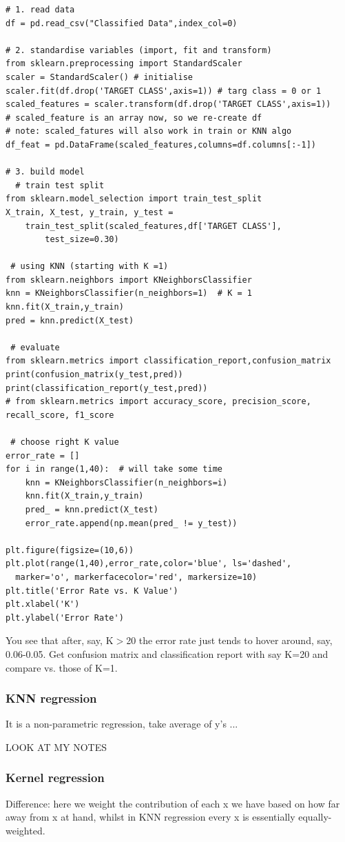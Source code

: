 \documentclass[12pt]{article}
\begin{document}
\begin{lstlisting}
# 1. read data
df = pd.read_csv("Classified Data",index_col=0)

# 2. standardise variables (import, fit and transform)
from sklearn.preprocessing import StandardScaler
scaler = StandardScaler() # initialise
scaler.fit(df.drop('TARGET CLASS',axis=1)) # targ class = 0 or 1
scaled_features = scaler.transform(df.drop('TARGET CLASS',axis=1))
# scaled_feature is an array now, so we re-create df
# note: scaled_fatures will also work in train or KNN algo
df_feat = pd.DataFrame(scaled_features,columns=df.columns[:-1])

# 3. build model
  # train test split
from sklearn.model_selection import train_test_split
X_train, X_test, y_train, y_test = 
	train_test_split(scaled_features,df['TARGET CLASS'],
		test_size=0.30)

 # using KNN (starting with K =1)
from sklearn.neighbors import KNeighborsClassifier
knn = KNeighborsClassifier(n_neighbors=1)  # K = 1
knn.fit(X_train,y_train)
pred = knn.predict(X_test)
 
 # evaluate
from sklearn.metrics import classification_report,confusion_matrix
print(confusion_matrix(y_test,pred))
print(classification_report(y_test,pred))
# from sklearn.metrics import accuracy_score, precision_score, recall_score, f1_score

 # choose right K value
error_rate = []
for i in range(1,40):  # will take some time
	knn = KNeighborsClassifier(n_neighbors=i)
	knn.fit(X_train,y_train)
	pred_ = knn.predict(X_test)
	error_rate.append(np.mean(pred_ != y_test))

plt.figure(figsize=(10,6))
plt.plot(range(1,40),error_rate,color='blue', ls='dashed', 
  marker='o', markerfacecolor='red', markersize=10)
plt.title('Error Rate vs. K Value')
plt.xlabel('K')
plt.ylabel('Error Rate')
\end{lstlisting}
You see that after, say, K$>$20 the error rate just tends to hover around, say, 0.06-0.05. Get confusion matrix and classification report with say K=20 and compare vs. those of K=1.

\subsubsection{KNN regression}
It is a non-parametric regression, take average of y's ...

LOOK AT MY NOTES

\subsubsection{Kernel regression}
Difference: here we weight the contribution of each x we have based on how far away from x at hand, whilst in KNN regression every x is essentially equally-weighted.
\end{document}
